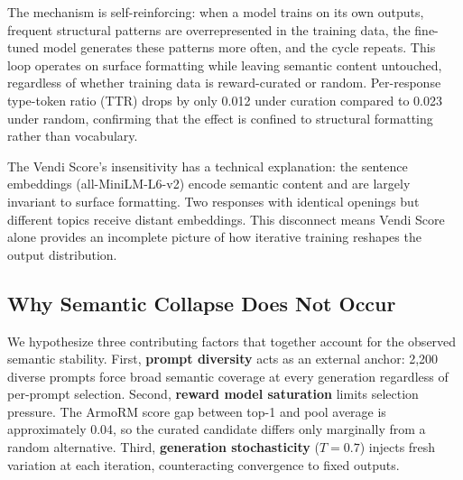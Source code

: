 \begin{table}[t]
\centering
\small
\caption{Format diversity metrics for LoRA $K{=}4$ curated (C1) and LoRA $K{=}4$ random baseline (C5). Both conditions show nearly identical degradation across all metrics, which confirms that format collapse is driven by iterative self-training rather than reward curation.}
\label{tab:format_collapse}
\end{table}

The mechanism is self-reinforcing: when a model trains on its own outputs, frequent structural patterns are overrepresented in the training data, the fine-tuned model generates these patterns more often, and the cycle repeats. This loop operates on surface formatting while leaving semantic content untouched, regardless of whether training data is reward-curated or random. Per-response type-token ratio (TTR) drops by only 0.012 under curation compared to 0.023 under random, confirming that the effect is confined to structural formatting rather than vocabulary.

The Vendi Score's insensitivity has a technical explanation: the sentence embeddings (all-MiniLM-L6-v2) encode semantic content and are largely invariant to surface formatting. Two responses with identical openings but different topics receive distant embeddings. This disconnect means Vendi Score alone provides an incomplete picture of how iterative training reshapes the output distribution.

\subsection{Why Semantic Collapse Does Not Occur}
\label{sec:why_no_collapse}

We hypothesize three contributing factors that together account for the observed semantic stability. First, \textbf{prompt diversity} acts as an external anchor: 2{,}200 diverse prompts force broad semantic coverage at every generation regardless of per-prompt selection. Second, \textbf{reward model saturation} limits selection pressure. The ArmoRM score gap between top-1 and pool average is approximately 0.04, so the curated candidate differs only marginally from a random alternative. Third, \textbf{generation stochasticity} ($T{=}0.7$) injects fresh variation at each iteration, counteracting convergence to fixed outputs.

